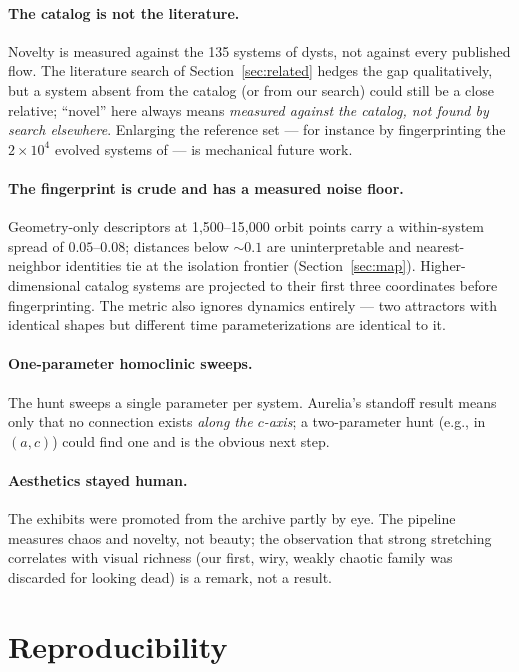\documentclass[11pt]{article}
\begin{document}
\paragraph{The catalog is not the literature.}
Novelty is measured against the 135 systems of \textsf{dysts}, not
against every published flow. The literature search of
Section~\ref{sec:related} hedges the gap qualitatively, but a system
absent from the catalog (or from our search) could still be a close
relative; ``novel'' here always means \emph{measured against the
catalog, not found by search elsewhere}. Enlarging the reference set ---
for instance by fingerprinting the $2\times10^4$ evolved systems of
\citet{lai2025panda} --- is mechanical future work.

\paragraph{The fingerprint is crude and has a measured noise floor.}
Geometry-only descriptors at 1{,}500--15{,}000 orbit points carry a
within-system spread of $0.05$--$0.08$; distances below ${\sim}0.1$ are
uninterpretable and nearest-neighbor identities tie at the isolation
frontier (Section~\ref{sec:map}). Higher-dimensional catalog systems are
projected to their first three coordinates before fingerprinting. The
metric also ignores dynamics entirely --- two attractors with identical
shapes but different time parameterizations are identical to it.

\paragraph{One-parameter homoclinic sweeps.}
The hunt sweeps a single parameter per system. Aurelia's standoff result
means only that no connection exists \emph{along the $c$-axis}; a
two-parameter hunt (e.g., in $(a,c)$) could find one and is the obvious
next step.

\paragraph{Aesthetics stayed human.}
The exhibits were promoted from the archive partly by eye. The pipeline
measures chaos and novelty, not beauty; the observation that strong
stretching correlates with visual richness (our first, wiry, weakly
chaotic family was discarded for looking dead) is a remark, not a result.

\section{Reproducibility}\label{sec:repro}
\end{document}
